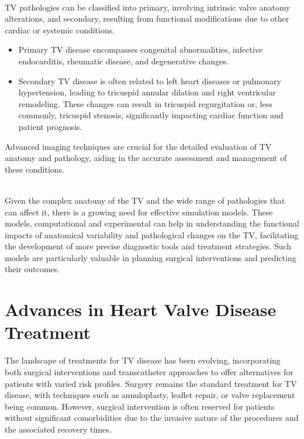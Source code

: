 \\
\gls{TV} pathologies can be classified into primary, involving intrinsic valve anatomy alterations, and secondary, resulting from functional modifications due to other cardiac or systemic conditions.
\begin{itemize}
    \item Primary \gls{TV} disease encompasses congenital abnormalities, infective endocarditis, rheumatic disease, and degenerative changes.
    \item Secondary \gls{TV} disease is often related to left heart diseases or pulmonary hypertension, leading to tricuspid annular dilation and right ventricular remodeling. These changes can result in tricuspid regurgitation or, less commonly, tricuspid stenosis, significantly impacting cardiac function and patient prognosis.
\end{itemize}
Advanced imaging techniques are crucial for the detailed evaluation of \gls{TV} anatomy and pathology, aiding in the accurate assessment and management of these conditions.~

\\
Given the complex anatomy of the \gls{TV} and the wide range of pathologies that can affect it, there is a growing need for effective simulation models. These models, computational and experimental can help in understanding the functional impacts of anatomical variability and pathological changes on the \gls{TV}, facilitating the development of more precise diagnostic tools and treatment strategies. Such models are particularly valuable in planning surgical interventions and predicting their outcomes.

\section{Advances in Heart Valve Disease Treatment}
The landscape of treatments for \gls{TV} disease has been evolving, incorporating both surgical interventions and transcatheter approaches to offer alternatives for patients with varied risk profiles. Surgery remains the standard treatment for \gls{TV} disease, with techniques such as annuloplasty, leaflet repair, or valve replacement being common. However, surgical intervention is often reserved for patients without significant comorbidities due to the invasive nature of the procedures and the associated recovery times.

